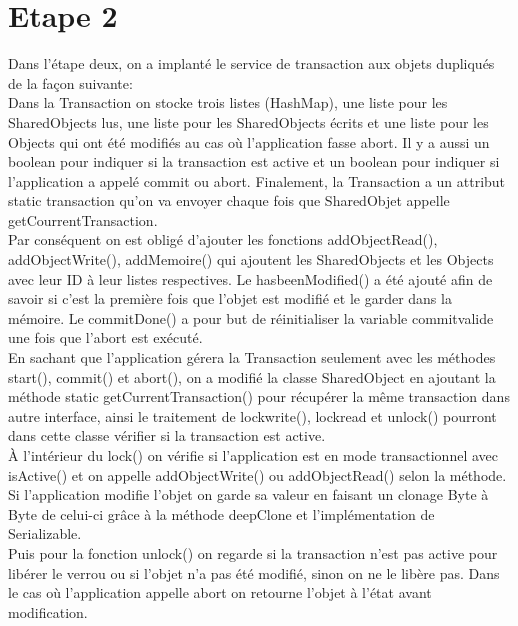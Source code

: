 \documentclass[a4paper,12pt]{article}
\begin{document}
\clearpage
\section{Etape 2}

\bigskip
\bigskip

Dans l’étape deux,  on a implanté le service de transaction aux objets dupliqués de la façon suivante:\\

Dans la Transaction on stocke trois listes (HashMap), une liste pour les SharedObjects lus, une liste pour les SharedObjects écrits et une liste pour les Objects qui ont été modifiés au cas où l’application fasse abort. Il y a aussi un boolean pour indiquer si la transaction est active et un boolean pour indiquer si l’application a appelé commit ou abort. Finalement, la Transaction a un attribut static transaction qu'on va envoyer chaque fois que SharedObjet appelle getCourrentTransaction. \\

Par conséquent on est obligé d'ajouter les fonctions addObjectRead(), addObjectWrite(), addMemoire() qui ajoutent les SharedObjects et les Objects avec leur ID à leur listes respectives. Le hasbeenModified() a été ajouté afin de savoir si c’est la première fois que l’objet est modifié et le garder dans la mémoire. Le commitDone() a pour but de réinitialiser la variable commitvalide une fois que l’abort est exécuté. \\

En sachant que l’application gérera la Transaction seulement avec les méthodes start(), commit() et abort(), on a modifié la classe SharedObject en ajoutant la méthode static getCurrentTransaction() pour récupérer la même transaction dans autre interface, ainsi le traitement de lockwrite(), lockread et unlock() pourront dans cette classe vérifier si la transaction est active.\\

À l’intérieur du lock() on vérifie si l’application est en mode transactionnel avec isActive() et  on appelle addObjectWrite() ou addObjectRead() selon la méthode. Si l’application modifie l’objet on garde sa valeur en faisant un clonage Byte à Byte de celui-ci grâce à la méthode deepClone et l’implémentation de Serializable. \\

Puis pour la fonction unlock() on regarde si la transaction n’est pas active pour libérer le verrou ou si l’objet n’a pas été modifié, sinon on ne le libère pas. Dans le cas où l’application appelle abort on retourne l’objet à l’état avant modification.\\
\end{document}
